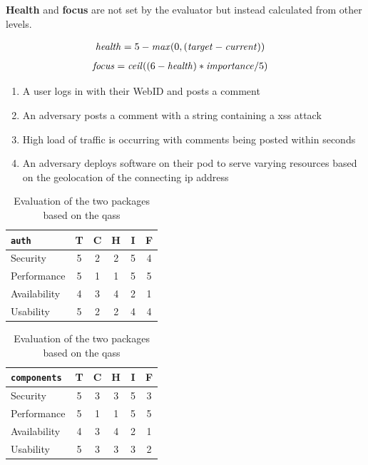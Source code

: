 \textbf{Health} and \textbf{focus} are not set by the evaluator but instead calculated from other levels.

\begin{align*}
    \text{\textit{health}}&=5 - \text{\textit{max}}(0, (\text{\textit{target}} - \text{\textit{current}}))
\end{align*}
\vspace{-5mm}
\begin{align*}
    \text{\textit{focus}}&= \text{\textit{ceil}}((6 - \text{\textit{health}}) * \text{\textit{importance}}/5)
\end{align*}

\begin{enumerate}
    \item A user logs in with their WebID and posts a comment
    \item An adversary posts a comment with a string containing a \gls{xss} attack
    \item High load of traffic is occurring with comments being posted within seconds
    \item An adversary deploys software on their pod to serve varying resources based on the geolocation of the connecting \gls{ip} address
\end{enumerate}

\begin{table}[h!]
    \centering
    \begin{tabular}{| l | c | c | c | c | c |} 
     \hline
     \texttt{auth} & T & C & H & I & F \\
     \hline
     Security & 5 & 2 & 2 & 5 & \cellcolor{red!25}4\\
     \hline
     Performance & 5 & 1 & 1 & 5 & \cellcolor{red!50}5\\
     \hline
     Availability & 4 & 3 & 4 & 2 & \cellcolor{green!25}1\\
     \hline
     Usability & 5 & 2 & 2 & 4 & \cellcolor{red!25}4\\
     \hline
    \end{tabular}
    \quad
    \begin{tabular}{| l | c | c | c | c | c |} 
     \hline
     \texttt{components} & T & C & H & I & F \\
     \hline
     Security & 5 & 3 & 3 & 5 & \cellcolor{orange!50}3\\
     \hline
     Performance & 5 & 1 & 1 & 5 & \cellcolor{red!50}5\\
     \hline
     Availability & 4 & 3 & 4 & 2 & \cellcolor{green!25}1\\
     \hline
     Usability & 5 & 3 & 3 & 3 & \cellcolor{green!25}2\\
     \hline
    \end{tabular}
    \vspace{0.75cm}
    \caption{Evaluation of the two packages based on the \glspl{qas}}
    \label{table:poc1-evaluation}
\end{table}

